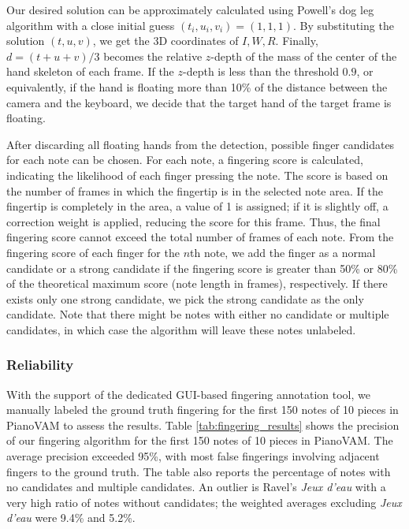 \documentclass{article}
\begin{document}
Our desired solution can be approximately calculated using Powell's dog leg algorithm with a close initial guess $(t_i,u_i,v_i)=(1,1,1)$. By substituting the solution $(t,u,v)$, we get the 3D coordinates of $I,W,R$.  Finally, $d=(t+u+v)/3$ becomes the relative $z$-depth of the mass of the center of the hand skeleton of each frame. If the $z$-depth is less than the threshold $0.9$, or equivalently, if the hand is floating more than 10\% of the distance between the camera and the keyboard, we decide that the target hand of the target frame is floating.



After discarding all floating hands from the detection, possible finger candidates for each note can be chosen. For each note, a fingering score is calculated, indicating the likelihood of each finger pressing the note. The score is based on the number of frames in which the fingertip is in the selected note area. If the fingertip is completely in the area, a value of 1 is assigned; if it is slightly off, a correction weight is applied, reducing the score for this frame. Thus, the final fingering score cannot exceed the total number of frames of each note. From the fingering score of each finger for the $n$th note, we add the finger as a normal candidate or a strong candidate if the fingering score is greater than 50\% or 80\% of the theoretical maximum score (note length in frames), respectively. If there exists only one strong candidate, we pick the strong candidate as the only candidate. Note that there might be notes with either no candidate or multiple candidates, in which case the algorithm will leave these notes unlabeled.

\subsubsection{Reliability}
With the support of the dedicated GUI-based fingering annotation tool, we manually labeled the ground truth fingering for the first 150 notes of 10 pieces in PianoVAM to assess the results. Table \ref{tab:fingering_results} shows the precision of our fingering algorithm for the first 150 notes of 10 pieces in PianoVAM. The average precision exceeded 95\%, with most false fingerings involving adjacent fingers to the ground truth. The table also reports the percentage of notes with no candidates and multiple candidates. %
An outlier is Ravel's \textit{Jeux d'eau} with a very high ratio of notes without candidates; the weighted averages excluding \textit{Jeux d'eau} were 9.4\% and 5.2\%.
\end{document}
